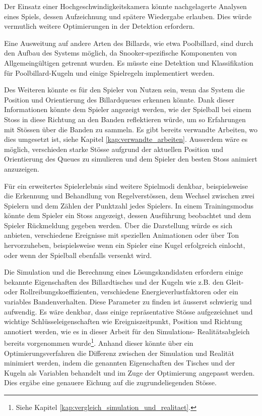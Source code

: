 Der Einsatz einer Hochgeschwindigkeitskamera könnte nachgelagerte Analysen eines Spiels,
dessen Aufzeichnung und spätere Wiedergabe erlauben.
Dies würde vermutlich weitere Optimierungen in der Detektion erfordern.

Eine Ausweitung auf andere Arten des Billards, wie etwa Poolbillard, sind durch den Aufbau des Systems möglich, da
Snooker-spezifische Komponenten von Allgemeingültigen getrennt wurden.
Es müsste eine Detektion und Klassifikation für Poolbillard-Kugeln und einige Spielregeln implementiert werden.

Des Weiteren könnte es für den Spieler von Nutzen sein, wenn das System die Position und Orientierung des Billardqueues
erkennen könnte.
Dank dieser Informationen könnte dem Spieler angezeigt werden, wie der Spielball bei einem Stoss in diese Richtung
an den Banden reflektieren würde, um so Erfahrungen mit Stössen über die Banden zu sammeln.
Es gibt bereits verwandte Arbeiten, wo dies umgesetzt ist, siehe Kapitel \ref{kap:verwandte_arbeiten}.
Ausserdem wäre es möglich, verschieden starke Stösse aufgrund der aktuellen Position und Orientierung des Queues zu simulieren
und dem Spieler den besten Stoss animiert anzuzeigen.

Für ein erweitertes Spielerlebnis sind weitere Spielmodi denkbar, beispielsweise die Erkennung und Behandlung von
Regelverstössen, dem Wechsel zwischen zwei Spielern und dem Zählen der Punktzahl jedes Spielers.
In einem Trainingsmodus könnte dem Spieler ein Stoss angezeigt, dessen Ausführung beobachtet und dem Spieler
Rückmeldung gegeben werden.
Über die Darstellung würde es sich anbieten, verschiedene Ereignisse mit speziellen Animationen oder über Ton hervorzuheben,
beispielsweise wenn ein Spieler eine Kugel erfolgreich einlocht, oder wenn der Spielball ebenfalls versenkt wird.

Die Simulation und die Berechnung eines Lösungskandidaten erfordern einige bekannte Eigenschaften des Billardtisches und
der Kugeln wie z.B. den Gleit- oder Rollreibungskoeffizienten, verschiedene Energieverlustfaktoren oder ein variables
Bandenverhalten. Diese Parameter zu finden ist äusserst schwierig und aufwendig. Es wäre denkbar, dass einige repräsentative
Stösse aufgezeichnet und wichtige Schlüsseleigenschaften wie Ereigniszeitpunkt, Position und Richtung annotiert werden,
wie es in dieser Arbeit für den Simulations- Realitätsabgleich bereits vorgenommen
wurde\footnote{Siehe Kapitel \ref{kap:vergleich_simulation_und_realitaet}.}. Anhand dieser könnte über ein Optimierungsverfahren
die Differenz zwischen der Simulation und Realität minimiert werden, indem die genannten Eigenschaften des Tisches und
der Kugeln als Variablen behandelt und im Zuge der Optimierung angepasst werden. Dies ergäbe eine genauere Eichung auf
die zugrundeliegenden Stösse.